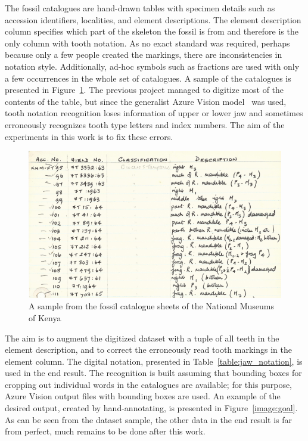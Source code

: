 \documentclass[english,twoside,openright]{UH_DS_MSc}
\begin{document}
The fossil catalogues are hand-drawn tables with specimen details such 
as accession identifiers, localities, and element descriptions. The element description 
column specifies which part of the skeleton the fossil is from and therefore is the only 
column with tooth notation.
As no exact standard was required, perhaps because only a few people 
created the markings, there are inconsistencies in notation style. Additionally,
ad-hoc symbols such as fractions are used with only a few occurrences in the whole set of catalogues. 
A sample of the catalogues is presented in Figure~\ref{image:cataloguesample}.
The previous project managed to digitize most of the contents of the table, but since 
the generalist Azure Vision model~\cite{azurevision} was used, tooth notation recognition
loses information of upper or lower jaw and sometimes
erroneously recognizes tooth type letters and index numbers.
The aim of the experiments in this work is to fix these errors.

\begin{figure}[ht]
    \centering
    \includegraphics*[scale=0.5]{images/cataloguesample3.png}
    \caption{A sample from the fossil catalogue sheets of the National Museums of Kenya}
    \label{image:cataloguesample}
\end{figure}

The aim is to augment the digitized dataset with a tuple of all teeth in the 
element description, and to correct the erroneously read tooth markings in the element column.
The digital notation, presented in Table~\ref{table:jaw_notation}, is used in the end result.
The recognition is built assuming that bounding boxes for cropping out individual words in the 
catalogues are available; for this purpose, Azure Vision output files with bounding boxes
are used. An example of the desired output,
created by hand-annotating, is presented in Figure~\ref{image:goal}. 
As can be seen from the dataset sample, the other data in the end result is far from perfect, much remains to be done after this work.
\end{document}

